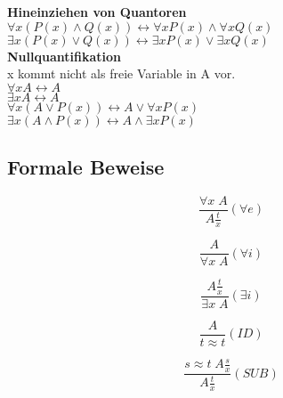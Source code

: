 \documentclass[11pt, a4paper,twocolumn]{scrartcl}
\begin{document}
{\bf Hineinziehen von Quantoren}\\
$\forall x (P(x)\land Q(x)) \leftrightarrow \forall x P(x) \land \forall x Q(x)$\\
$\exists x (P(x)\lor Q(x)) \leftrightarrow \exists x P(x) \lor \exists x Q(x)$\\

{\bf Nullquantifikation}\\
x kommt nicht als freie Variable in A vor.\\
$\forall x A \leftrightarrow A$\\
$\exists x A \leftrightarrow A$\\
$\forall x (A \lor P(x)) \leftrightarrow A \lor \forall x P(x)$\\
$\exists x (A \land P(x)) \leftrightarrow A \land \exists x P(x)$\\


\subsection{Formale Beweise}
\begin{minipage}{3.8cm}\begin{displaymath}\frac{\forall x \; A}{A \frac{t}{x}}(\forall e)\end{displaymath}\end{minipage}
\begin{minipage}{3.8cm}\begin{displaymath}\frac{A}{\forall x \; A}(\forall i)\end{displaymath}\end{minipage}

\begin{minipage}{3.8cm}\begin{displaymath}\frac{A \frac{t}{x}}{\exists x \; A}(\exists i)\end{displaymath}\end{minipage}

\begin{minipage}{3.8cm}\begin{displaymath}\frac{A}{t \approx t}(ID)\end{displaymath}\end{minipage}
\begin{minipage}{3.8cm}\begin{displaymath}\frac{s \approx t \; A\frac{s}{x}}{A\frac{t}{x}}(SUB)\end{displaymath}\end{minipage}
\end{document}
